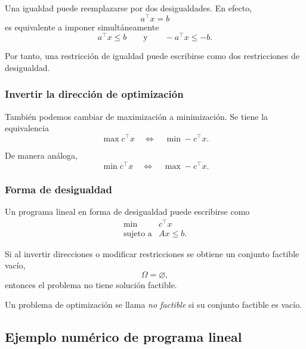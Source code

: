 Una igualdad puede reemplazarse por dos desigualdades. En efecto,
\[
    a^\top x=b
\]
es equivalente a imponer simultáneamente
\[
    a^\top x\leq b
    \qquad \text{y} \qquad
    -a^\top x\leq -b.
\]

Por tanto, una restricción de igualdad puede escribirse como dos restricciones de desigualdad.

\subsubsection{Invertir la dirección de optimización}

También podemos cambiar de maximización a minimización. Se tiene la equivalencia
\[
    \max c^\top x
    \quad \Longleftrightarrow \quad
    \min -c^\top x.
\]

De manera análoga,
\[
    \min c^\top x
    \quad \Longleftrightarrow \quad
    \max -c^\top x.
\]

\subsubsection{Forma de desigualdad}

Un programa lineal en forma de desigualdad puede escribirse como
\[
    \begin{array}{ll}
        \min & c^\top x\\[1mm]
        \text{sujeto a} & Ax\leq b.
    \end{array}
\]

Si al invertir direcciones o modificar restricciones se obtiene un conjunto factible vacío,
\[
    \Omega=\varnothing,
\]
entonces el problema no tiene solución factible.

\begin{definition}
Un problema de optimización se llama \emph{no factible} si su conjunto factible es vacío.
\end{definition}

\subsection{Ejemplo numérico de programa lineal}

